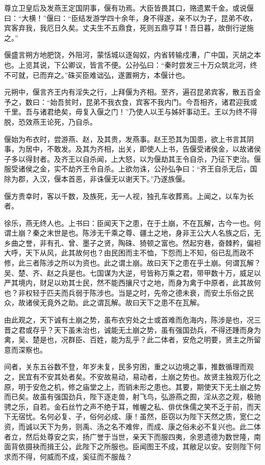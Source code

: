 \documentclass[12pt,UTF8]{ctexbook}
\begin{document}
尊立卫皇后及发燕王定国阴事，偃有功焉。大臣皆畏其口，赂遗累千金。或说偃曰：“大横！”偃曰：“臣结发游学四十余年，身不得遂，亲不以为子，昆弟不收，宾客弃我，我厄日久矣。丈夫生不五鼎食，死则五鼎亨耳！吾日暮，故倒行逆施之。”



偃盛言朔方地肥饶，外阻河，蒙恬城以逐匈奴，内省转输戍漕，广中国，灭胡之本也。上览其说，下公卿议，皆言不便。公孙弘曰：“秦时尝发三十万众筑北河，终不可就，已而弃之。”硃买臣难诎弘，遂置朔方，本偃计也。



元朔中，偃言齐王内有淫失之行，上拜偃为齐相。至齐，遍召昆弟宾客，散五百金予之，数曰：“始吾贫时，昆弟不我衣食，宾客不我内门。今吾相齐，诸君迎我或千里。吾与诸君绝矣，毋复入偃之门！”乃使人以王与姊奸事动王。王以为终不得脱，恐效燕王论死，乃自杀。



偃始为布衣时，尝游燕、赵，及其贵，发燕事。赵王恐其为国患，欲上书言其阴事，为居中，不敢发。及其为齐相，出关，即使人上书，告偃受诸侯金，以故诸侯子多以得封者。及齐王以自杀闻，上大怒，以为偃劫其王令自杀，乃征下吏治。偃服受诸侯之金，实不劫齐王令自杀。上欲勿诛，公孙弘争曰：“齐王自杀无后，国除为郡，入汉，偃本首恶，非诛偃无以谢天下。”乃遂族偃。



偃方贵幸时，客以千数，及族死，无一人视，独孔车收葬焉。上闻之，以车为长者。



徐乐，燕无终人也。上书曰：臣闻天下之患，在于土崩，不在瓦解，古今一也。何谓土崩？秦之末世是也。陈涉无千乘之尊、疆土之地，身非王公大人名族之后，无乡曲之誉，非有孔、曾、墨子之贤，陶硃、猗顿之富也。然起穷巷，奋棘矜，偏袒大呼，天下从风，此其故何也？由民困而主不恤，下怨而上不知，俗已乱而政不修，此三者陈涉之所以为资也。此之谓土崩。故曰天下之患在乎土崩。何谓瓦解？吴、楚、齐、赵之兵是也。七国谋为大逆，号皆称万乘之君，带甲数十万，威足以严其境内，财足以劝其士民，然不能西攘尺寸之地，而身为禽于中原者，此其故何也？非权轻于匹夫而兵弱于陈涉也。当是之时，先帝之德未衰，而安土乐俗之民众，故诸侯无竟外之助。此之谓瓦解。故曰天下之患不在瓦解。



由此观之，天下诚有土崩之势，虽布衣穷处之士或首难而危海内，陈涉是也，况三晋之君或存乎？天下虽未治也，诚能无土崩之势，虽有强国劲兵，不得还踵而身为禽，吴、楚是也，况群臣、百姓，能为乱乎？此二体者，安危之明要，贤主之所留意而深察也。



间者，关东五谷数不登，年岁未复，民多穷困，重之以边境之事，推数循理而观之，民宜有不安其处者矣。不安故易动，易动者，土崩之势也。故贤主独观万化之原，明于安危之机，修之庙堂之上，而销未形之患也。其要，期使天下无土崩之势而已矣。故虽有强国劲兵，陛下逐走兽，射飞鸟，弘游燕之囿，淫从恣之观，极驰骋之乐，自若。金石丝竹之声不绝于耳，帷幄之私、俳优侏儒之笑不乏于前，而天下无宿忧。名何必复、子，俗何必成、康！虽然，臣窃以为陛下天然之质，宽仁之资，而诚以天下为务，则禹、汤之名不难侔，而成、康之俗未必不复兴也。此二体者立，然后处尊安之实，扬广誉于当世，亲天下而服四夷，余恩遗德为数世隆，南面背依摄袂而揖王公，此陛下之所服也。臣闻图王不成，其敝足以安。安则陛下何求而不得，何威而不成，奚征而不服哉？
\end{document}
